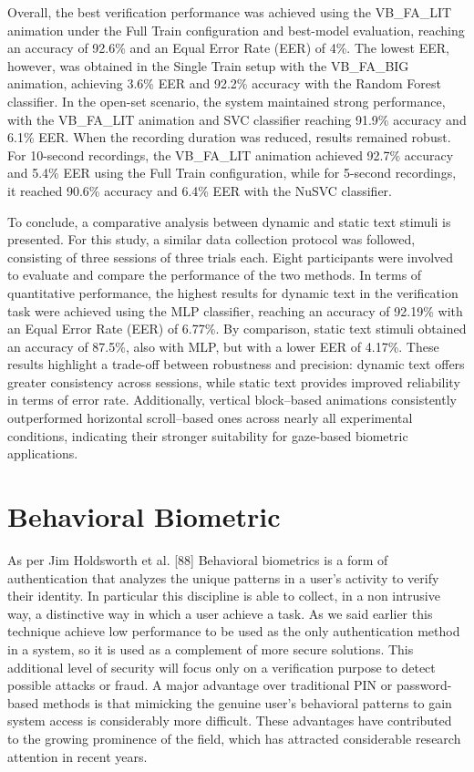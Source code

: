\documentclass{article}
\begin{document}
Overall, the best verification performance was achieved using the VB\_FA\_LIT animation under the Full Train configuration and best-model evaluation, reaching an accuracy of 92.6\% and an Equal Error Rate (EER) of 4\%.
The lowest EER, however, was obtained in the Single Train setup with the VB\_FA\_BIG animation, achieving 3.6\% EER and 92.2\% accuracy with the Random Forest classifier.
In the open-set scenario, the system maintained strong performance, with the VB\_FA\_LIT animation and SVC classifier reaching 91.9\% accuracy and 6.1\% EER.
When the recording duration was reduced, results remained robust.
For 10-second recordings, the VB\_FA\_LIT animation achieved 92.7\% accuracy and 5.4\% EER using the Full Train configuration, while for 5-second recordings, it reached 90.6\% accuracy and 6.4\% EER with the NuSVC classifier.

To conclude, a comparative analysis between dynamic and static text stimuli is presented.
For this study, a similar data collection protocol was followed, consisting of three sessions of three trials each.
Eight participants were involved to evaluate and compare the performance of the two methods.
In terms of quantitative performance, the highest results for dynamic text in the verification task were achieved using the MLP classifier, reaching an accuracy of 92.19\% with an Equal Error Rate (EER) of 6.77\%.
By comparison, static text stimuli obtained an accuracy of 87.5\%, also with MLP, but with a lower EER of 4.17\%.
These results highlight a trade-off between robustness and precision: dynamic text offers greater consistency across sessions, while static text provides improved reliability in terms of error rate.
Additionally, vertical block–based animations consistently outperformed horizontal scroll–based ones across nearly all experimental conditions, indicating their stronger suitability for gaze-based biometric applications.

\newpage

\section{Behavioral Biometric}
\noindent
As per Jim Holdsworth et al. [88] Behavioral biometrics is a form of authentication that analyzes the unique patterns in a user's activity to verify their identity. 
In particular this discipline is able to collect, in a non intrusive way, a distinctive way in which a user achieve a task.
As we said earlier this technique achieve low performance to be used as the only authentication method in a system, so it is used as a complement of more secure solutions.
This additional level of security will focus only on a verification purpose to detect possible attacks or fraud.
A major advantage over traditional PIN or password-based methods is that mimicking the genuine user's behavioral patterns to gain system access is considerably more difficult.
These advantages have contributed to the growing prominence of the field, which has attracted considerable research attention in recent years.
\end{document}
